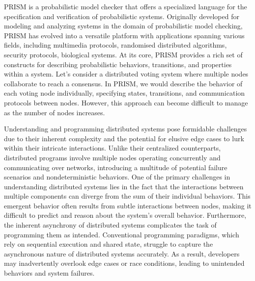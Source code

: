 \begin{comment}
This is the introduction

- introduce the PRISM language and use a running example.

- argue that these sorts of distributed programs are hard to
understand and it is hard to programme them as intended since we may
miss hidden cases.

- introduce the concept of choreography and show how the example in
PRISM could be rewritten in a more concise way.

- End with a statement that says what this paper is doing.
\end{comment}
PRISM \cite{PRISMdoc} is a probabilistic model checker that offers a specialized language for the specification and verification of probabilistic systems. Originally developed for modeling and analyzing systems in the domain of probabilistic model checking, PRISM has evolved into a versatile platform with applications spanning various fields, including multimedia protocols, randomised distributed algorithms, security protocols, biological systems.
At its core, PRISM provides a rich set of constructs for describing probabilistic behaviors, transitions, and properties within a system. 
Let's consider a distributed voting system where multiple nodes collaborate to reach a consensus. In PRISM, we would describe the behavior of each voting node individually, specifying states, transitions, and communication protocols between nodes. However, this approach can become difficult to manage as the number of nodes increases.

Understanding and programming distributed systems pose formidable challenges due to their inherent complexity and the potential for elusive edge cases to lurk within their intricate interactions. Unlike their centralized counterparts, distributed programs involve multiple nodes operating concurrently and communicating over networks, introducing a multitude of potential failure scenarios and nondeterministic behaviors.
One of the primary challenges in understanding distributed systems lies in the fact that the interactions between multiple components can diverge from the sum of their individual behaviors. This emergent behavior often results from subtle interactions between nodes, making it difficult to predict and reason about the system's overall behavior.
Furthermore, the inherent asynchrony of distributed systems complicates the task of programming them as intended. Conventional programming paradigms, which rely on sequential execution and shared state, struggle to capture the asynchronous nature of distributed systems accurately. As a result, developers may inadvertently overlook edge cases or race conditions, leading to unintended behaviors and system failures.

